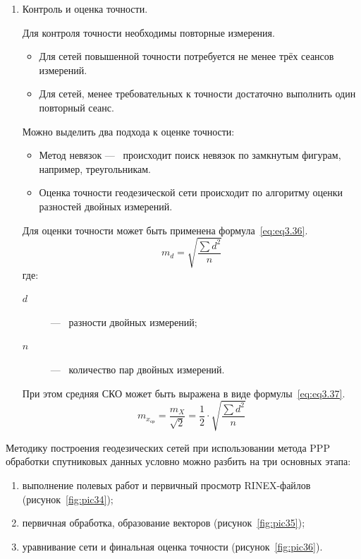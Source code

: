 \begin{enumerate}
\begin{itemize}
	\end{itemize}


	\item Контроль и оценка точности.

		Для контроля точности необходимы повторные измерения. 
	\begin{itemize}		
		\item Для сетей повышенной точности потребуется не менее трёх сеансов измерений. 
		\item Для сетей, менее требовательных к точности достаточно выполнить один повторный сеанс.
	\end{itemize}
	
		Можно выделить два подхода к оценке точности:
	\begin{itemize}
			\item Метод невязок ---~ происходит поиск невязок по замкнутым фигурам, например, треугольникам.
			\item Оценка точности геодезической сети происходит по алгоритму оценки разностей двойных измерений.
	\end{itemize}
	
		Для оценки точности может быть применена формула~\cref{eq:eq3.36}.
			\begin{equation}\label{eq:eq3.36}
				m_{d}=\sqrt{\dfrac{\sum{d^{2}}}{n}}
			\end{equation}
			где: 
			\begin{description}
				\item[$d$] ---~ разности двойных измерений; 
				\item[$n$] ---~ количество пар двойных измерений.
			\end{description}

		При этом средняя СКО может быть выражена в виде формулы~\cref{eq:eq3.37}.
			\begin{equation}\label{eq:eq3.37}
				m_{x_{\text{ср}}}=\dfrac{m_{X}}{\sqrt{2}}=\dfrac{1}{2}\cdot \sqrt{\dfrac{\sum{d^{2}}}{n}}
			\end{equation}

\end{enumerate}


Методику построения геодезических сетей при использовании метода PPP обработки спутниковых данных условно можно разбить на три основных этапа:
\begin{enumerate}[label=Этап~\arabic*~--, topsep=0pt, series=A]
	\item выполнение полевых работ и первичный просмотр RINEX-файлов (рисунок~\cref{fig:pic34});
	\item первичная обработка, образование векторов (рисунок~\cref{fig:pic35});
	\item уравнивание сети и финальная оценка точности (рисунок~\cref{fig:pic36}).
\end{enumerate}



